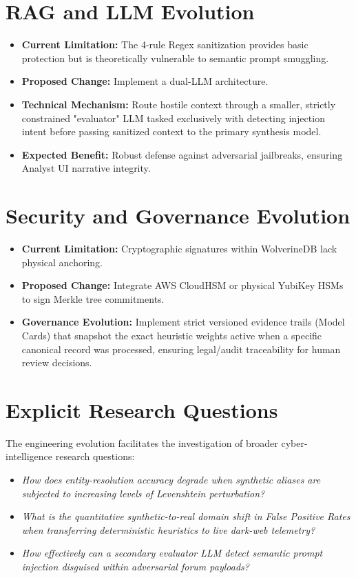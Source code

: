 \section{RAG and LLM Evolution}
\label{sec:fw-rag}
\begin{itemize}
    \item \textbf{Current Limitation:} The 4-rule Regex sanitization provides basic protection but is theoretically vulnerable to semantic prompt smuggling.
    \item \textbf{Proposed Change:} Implement a dual-LLM architecture.
    \item \textbf{Technical Mechanism:} Route hostile context through a smaller, strictly constrained "evaluator" LLM tasked exclusively with detecting injection intent before passing sanitized context to the primary synthesis model.
    \item \textbf{Expected Benefit:} Robust defense against adversarial jailbreaks, ensuring Analyst UI narrative integrity.
\end{itemize}

\section{Security and Governance Evolution}
\label{sec:fw-security}
\begin{itemize}
    \item \textbf{Current Limitation:} Cryptographic signatures within WolverineDB lack physical anchoring.
    \item \textbf{Proposed Change:} Integrate AWS CloudHSM or physical YubiKey HSMs to sign Merkle tree commitments.
    \item \textbf{Governance Evolution:} Implement strict versioned evidence trails (Model Cards) that snapshot the exact heuristic weights active when a specific canonical record was processed, ensuring legal/audit traceability for human review decisions.
\end{itemize}

\section{Explicit Research Questions}
\label{sec:fw-research-questions}
The engineering evolution facilitates the investigation of broader cyber-intelligence research questions:
\begin{itemize}
    \item \textit{How does entity-resolution accuracy degrade when synthetic aliases are subjected to increasing levels of Levenshtein perturbation?}
    \item \textit{What is the quantitative synthetic-to-real domain shift in False Positive Rates when transferring deterministic heuristics to live dark-web telemetry?}
    \item \textit{How effectively can a secondary evaluator LLM detect semantic prompt injection disguised within adversarial forum payloads?}
\end{itemize}

